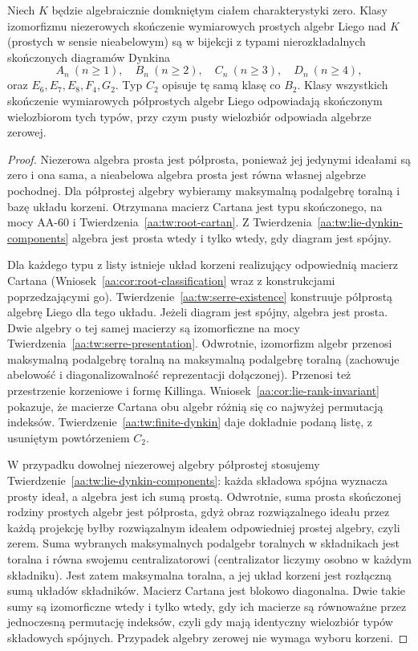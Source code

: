 \begin{twierdzenie}[Klasyfikacja]
\label{aa:tw:lie-semisimple-classification}
Niech $K$ będzie algebraicznie domkniętym ciałem charakterystyki zero. Klasy izomorfizmu niezerowych skończenie wymiarowych prostych algebr Liego nad $K$ (prostych w sensie nieabelowym) są w bijekcji z typami nierozkładalnych skończonych diagramów Dynkina
\[
 A_n\ (n\ge1),\quad B_n\ (n\ge2),\quad
 C_n\ (n\ge3),\quad D_n\ (n\ge4),
\]
oraz $E_6,E_7,E_8,F_4,G_2$. Typ $C_2$ opisuje tę samą klasę co $B_2$. Klasy wszystkich skończenie wymiarowych półprostych algebr Liego odpowiadają skończonym wielozbiorom tych typów, przy czym pusty wielozbiór odpowiada algebrze zerowej.
\end{twierdzenie}
\begin{proof}
Niezerowa algebra prosta jest półprosta, ponieważ jej jedynymi ideałami są zero i ona sama, a nieabelowa algebra prosta jest równa własnej algebrze pochodnej. Dla półprostej algebry wybieramy maksymalną podalgebrę toralną i bazę układu korzeni. Otrzymana macierz Cartana jest typu skończonego, na mocy AA-60 i Twierdzenia~\ref{aa:tw:root-cartan}. Z Twierdzenia~\ref{aa:tw:lie-dynkin-components} algebra jest prosta wtedy i tylko wtedy, gdy diagram jest spójny.

Dla każdego typu z listy istnieje układ korzeni realizujący odpowiednią macierz Cartana (Wniosek~\ref{aa:cor:root-classification} wraz z konstrukcjami poprzedzającymi go). Twierdzenie~\ref{aa:tw:serre-existence} konstruuje półprostą algebrę Liego dla tego układu. Jeżeli diagram jest spójny, algebra jest prosta. Dwie algebry o tej samej macierzy są izomorficzne na mocy Twierdzenia~\ref{aa:tw:serre-presentation}. Odwrotnie, izomorfizm algebr przenosi maksymalną podalgebrę toralną na maksymalną podalgebrę toralną (zachowuje abelowość i diagonalizowalność reprezentacji dołączonej). Przenosi też przestrzenie korzeniowe i formę Killinga. Wniosek~\ref{aa:cor:lie-rank-invariant} pokazuje, że macierze Cartana obu algebr różnią się co najwyżej permutacją indeksów. Twierdzenie~\ref{aa:tw:finite-dynkin} daje dokładnie podaną listę, z usuniętym powtórzeniem $C_2$.

W przypadku dowolnej niezerowej algebry półprostej stosujemy Twierdzenie~\ref{aa:tw:lie-dynkin-components}: każda składowa spójna wyznacza prosty ideał, a algebra jest ich sumą prostą. Odwrotnie, suma prosta skończonej rodziny prostych algebr jest półprosta, gdyż obraz rozwiązalnego ideału przez każdą projekcję byłby rozwiązalnym ideałem odpowiedniej prostej algebry, czyli zerem. Suma wybranych maksymalnych podalgebr toralnych w składnikach jest toralna i równa swojemu centralizatorowi (centralizator liczymy osobno w każdym składniku). Jest zatem maksymalna toralna, a jej układ korzeni jest rozłączną sumą układów składników. Macierz Cartana jest blokowo diagonalna. Dwie takie sumy są izomorficzne wtedy i tylko wtedy, gdy ich macierze są równoważne przez jednoczesną permutację indeksów, czyli gdy mają identyczny wielozbiór typów składowych spójnych. Przypadek algebry zerowej nie wymaga wyboru korzeni.
\end{proof}


